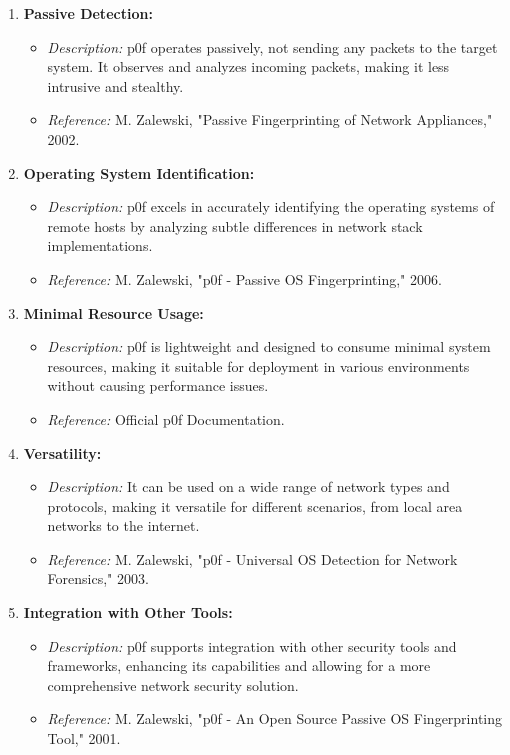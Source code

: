 \documentclass[11pt]{article}
\begin{document}
\begin{enumerate}
    \item \textbf{Passive Detection:}
    \begin{itemize}
        \item \textit{Description:} p0f operates passively, not sending any packets to the target system. It observes and analyzes incoming packets, making it less intrusive and stealthy.
        \item \textit{Reference:} M. Zalewski, "Passive Fingerprinting of Network Appliances," 2002.
    \end{itemize}

    \item \textbf{Operating System Identification:}
    \begin{itemize}
        \item \textit{Description:} p0f excels in accurately identifying the operating systems of remote hosts by analyzing subtle differences in network stack implementations.
        \item \textit{Reference:} M. Zalewski, "p0f - Passive OS Fingerprinting," 2006.
    \end{itemize}

    \item \textbf{Minimal Resource Usage:}
    \begin{itemize}
        \item \textit{Description:} p0f is lightweight and designed to consume minimal system resources, making it suitable for deployment in various environments without causing performance issues.
        \item \textit{Reference:} Official p0f Documentation.
    \end{itemize}

    \item \textbf{Versatility:}
    \begin{itemize}
        \item \textit{Description:} It can be used on a wide range of network types and protocols, making it versatile for different scenarios, from local area networks to the internet.
        \item \textit{Reference:} M. Zalewski, "p0f - Universal OS Detection for Network Forensics," 2003.
    \end{itemize}

    \item \textbf{Integration with Other Tools:}
    \begin{itemize}
        \item \textit{Description:} p0f supports integration with other security tools and frameworks, enhancing its capabilities and allowing for a more comprehensive network security solution.
        \item \textit{Reference:} M. Zalewski, "p0f - An Open Source Passive OS Fingerprinting Tool," 2001.
    \end{itemize}
\end{enumerate}
\end{document}
